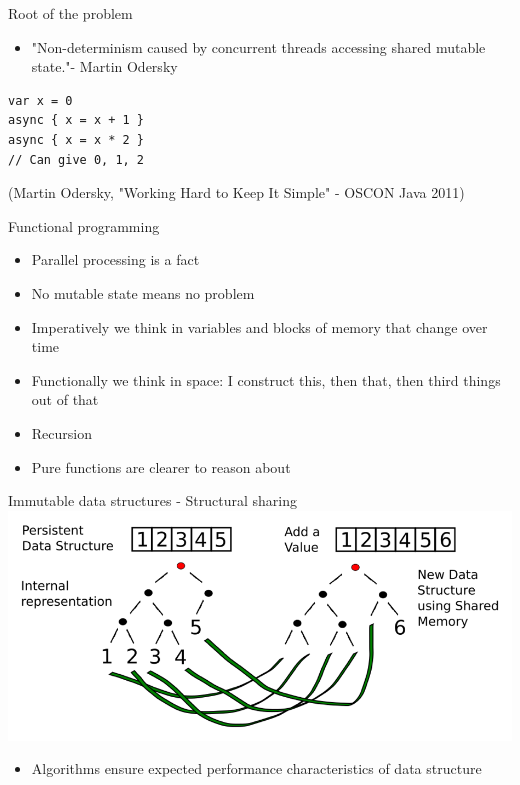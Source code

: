 \documentclass[presentation]{beamer}
\begin{document}
\begin{frame}[fragile,label={sec:orgheadline13}]{Root of the problem}
 \begin{itemize}
\item "\alert{Non-determinism} caused by \alert{concurrent threads} accessing \alert{shared mutable} state."- Martin Odersky
\end{itemize}

\begin{verbatim}
var x = 0
async { x = x + 1 }
async { x = x * 2 }
// Can give 0, 1, 2
\end{verbatim}
(Martin Odersky, "Working Hard to Keep It Simple" - OSCON Java 2011)
\end{frame}

\begin{frame}[label={sec:orgheadline14}]{Functional programming}
\begin{itemize}
\item Parallel processing is a fact
\item \alert{No mutable state} means no problem
\item Imperatively we think in variables and blocks of memory that change over \alert{time}
\item Functionally we think in \alert{space}: I construct this, then that, then third things out of that
\item Recursion
\item \alert{Pure functions} are clearer to reason about
\end{itemize}
\end{frame}
\begin{frame}[label={sec:orgheadline15}]{Immutable data structures - Structural sharing}
\includegraphics[width=.9\linewidth]{../images/immutable_data_structures.png}
\begin{itemize}
\item Algorithms ensure expected performance characteristics of data structure
\end{itemize}
\end{frame}
\end{document}
